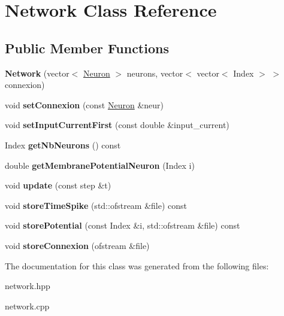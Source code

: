 \hypertarget{classNetwork}{\section{Network Class Reference}
\label{classNetwork}
}
\subsection*{Public Member Functions}
\begin{DoxyCompactItemize}
\item 
\hypertarget{classNetwork_ad037e83127d04659334234b82274da95}{{\bfseries Network} (vector$<$ \hyperlink{classNeuron}{Neuron} $>$ neurons, vector$<$ vector$<$ Index $>$ $>$ connexion)}\label{classNetwork_ad037e83127d04659334234b82274da95}

\item 
\hypertarget{classNetwork_af8041211083d11f63b8e0fbd5bc10b5b}{void {\bfseries set\-Connexion} (const \hyperlink{classNeuron}{Neuron} \&neur)}\label{classNetwork_af8041211083d11f63b8e0fbd5bc10b5b}

\item 
\hypertarget{classNetwork_ad48e7a97a427588226ea445bc5e9a9ff}{void {\bfseries set\-Input\-Current\-First} (const double \&input\-\_\-current)}\label{classNetwork_ad48e7a97a427588226ea445bc5e9a9ff}

\item 
\hypertarget{classNetwork_a91b4de88cf516e2971e064fc38e9c938}{Index {\bfseries get\-Nb\-Neurons} () const }\label{classNetwork_a91b4de88cf516e2971e064fc38e9c938}

\item 
\hypertarget{classNetwork_aefca6fc0d764730dc4a23df82eb15320}{double {\bfseries get\-Membrane\-Potential\-Neuron} (Index i)}\label{classNetwork_aefca6fc0d764730dc4a23df82eb15320}

\item 
\hypertarget{classNetwork_ab79d5782d33c2cf69f7a2a00bbc534db}{void {\bfseries update} (const step \&t)}\label{classNetwork_ab79d5782d33c2cf69f7a2a00bbc534db}

\item 
\hypertarget{classNetwork_ad69a9355cb163b97e3d8efede48c1433}{void {\bfseries store\-Time\-Spike} (std\-::ofstream \&file) const }\label{classNetwork_ad69a9355cb163b97e3d8efede48c1433}

\item 
\hypertarget{classNetwork_a0a397c35415b2f9255969a13c80af9ec}{void {\bfseries store\-Potential} (const Index \&i, std\-::ofstream \&file) const }\label{classNetwork_a0a397c35415b2f9255969a13c80af9ec}

\item 
\hypertarget{classNetwork_a7aa4884498278f1b18c4f0c050592b95}{void {\bfseries store\-Connexion} (ofstream \&file)}\label{classNetwork_a7aa4884498278f1b18c4f0c050592b95}

\end{DoxyCompactItemize}


The documentation for this class was generated from the following files\-:\begin{DoxyCompactItemize}
\item 
network.\-hpp\item 
network.\-cpp\end{DoxyCompactItemize}

